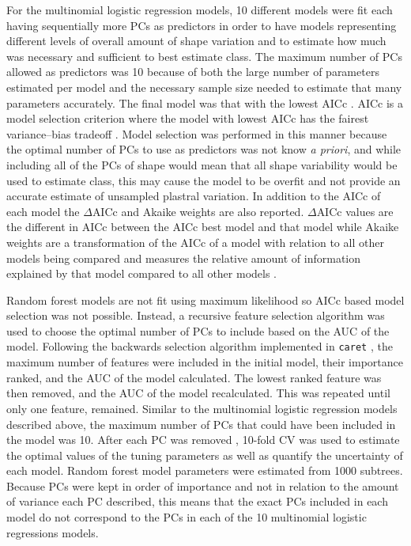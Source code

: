 \documentclass[12pt,letterpaper]{article}\usepackage{graphicx, color}
\begin{document}
For the multinomial logistic regression models, 10 different models were fit each having sequentially more PCs as predictors in order to have models representing different levels of overall amount of shape variation and to estimate how much was necessary and sufficient to best estimate class. The maximum number of PCs allowed as predictors was 10 because of both the large number of parameters estimated per model and the necessary sample size needed to estimate that many parameters accurately. The final model was that with the lowest AICc \citep{Akaike1974,Hurvich1989,Burnham2002a}. AICc is a model selection criterion where the model with lowest AICc has the fairest variance--bias tradeoff \citep{Burnham2002a}. Model selection was performed in this manner because the optimal number of PCs to use as predictors was not know \textit{a priori}, and while including all of the PCs of shape would mean that all shape variability would be used to estimate class, this may cause the model to be overfit and not provide an accurate estimate of unsampled plastral variation. In addition to the AICc of each model the \(\Delta\)AICc and Akaike weights are also reported. \(\Delta\)AICc values are the different in AICc between the AICc best model and that model while Akaike weights are a transformation of the AICc of a model with relation to all other models being compared and measures the relative amount of information explained by that model compared to all other models \citep{Burnham2002a}. 

Random forest models are not fit using maximum likelihood so AICc based model selection was not possible. Instead, a recursive feature selection algorithm was used to choose the optimal number of PCs to include based on the AUC of the model. Following the backwards selection algorithm implemented in \texttt{caret} \citep{Kuhn2013}, the maximum number of features were included in the initial model, their importance ranked, and the AUC of the model calculated. The lowest ranked feature was then removed, and the AUC of the model recalculated. This was repeated until only one feature, remained. Similar to the multinomial logistic regression models described above, the maximum number of PCs that could have been included in the model was 10. After each PC was removed , 10-fold CV was used to estimate the optimal values of the tuning parameters as well as quantify the uncertainty of each model. Random forest model parameters were estimated from 1000 subtrees. Because PCs were kept in order of importance and not in relation to the amount of variance each PC described, this means that the exact PCs included in each model do not correspond to the PCs in each of the 10 multinomial logistic regressions models.
\end{document}
